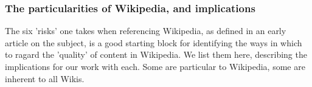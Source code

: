 \documentclass[a4paper,11pt,twoside,notitlepage]{article}
\begin{document}
        \subsubsection{The particularities of Wikipedia, and implications}



        The six 'risks' one takes when referencing Wikipedia, as
        defined in an early article on the subject,\cite{Denning2005}
        is a good starting block for identifying the ways in which to
        ragard the 'quality' of content in Wikipedia. We list them
        here, describing the implications for our work with each. Some
        are particular to Wikipedia, some are inherent to all Wikis.
        
\end{document}
